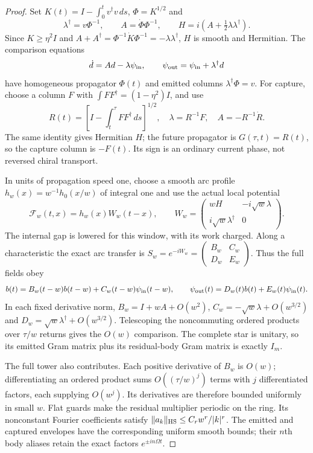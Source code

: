 \begin{proof}
Set $K(t)=I-\int_0^t v^\dagger v\,ds$, $\Phi=K^{1/2}$ and
\[
 \lambda^\dagger=v\Phi^{-1},\qquad
 A=\dot\Phi\Phi^{-1},\qquad
 H=i\left(A+\tfrac12\lambda\lambda^\dagger\right).
\]
Since $K\ge\eta^2I$ and
$A+A^\dagger=\Phi^{-1}\dot K\Phi^{-1}
=-\lambda\lambda^\dagger$, $H$ is smooth and Hermitian.
The comparison equations
\[
 \dot d=Ad-\lambda\psi_{\rm in},\qquad
 \psi_{\rm out}=\psi_{\rm in}+\lambda^\dagger d
\]
have homogeneous propagator $\Phi(t)$ and emitted columns
$\lambda^\dagger\Phi=v$. For capture, choose a column $F$ with
$\int FF^\dagger=(1-\eta^2)I$, and use
\[
 R(t)=\left[I-\int_t^\tau FF^\dagger\,ds\right]^{1/2},\quad
 \lambda=R^{-1}F,\quad A=-R^{-1}\dot R.
\]
The same identity gives Hermitian $H$; the future propagator is
$G(\tau,t)=R(t)$, so the capture column is $-F(t)$.
Its sign is an ordinary current phase, not reversed chiral transport.

In units of propagation speed one, choose a smooth arc profile
$h_w(x)=w^{-1}h_0(x/w)$ of integral one and use the actual local
potential
\begin{equation}
 \mathcal F_w(t,x)=h_w(x)W_w(t-x),\qquad
 W_w=\begin{pmatrix}
 wH&-i\sqrt w\lambda\\ i\sqrt w\lambda^\dagger&0
 \end{pmatrix}.
 \label{eq:packet-star}
\end{equation}
The internal gap is lowered for this window, with its work charged.
Along a characteristic the exact arc transfer is
$S_w=e^{-iW_w}=\left(\begin{smallmatrix}B_w&C_w\\D_w&E_w\end{smallmatrix}\right)$.
Thus the full fields obey
\[
 b(t)=B_w(t-w)b(t-w)+C_w(t-w)\psi_{\rm in}(t-w),\qquad
 \psi_{\rm out}(t)=D_w(t)b(t)+E_w(t)\psi_{\rm in}(t).
\]
In each fixed derivative norm,
$B_w=I+wA+O(w^2)$,
$C_w=-\sqrt w\lambda+O(w^{3/2})$ and
$D_w=\sqrt w\lambda^\dagger+O(w^{3/2})$.
Telescoping the noncommuting ordered products over $\tau/w$
returns gives the $O(w)$ comparison. The complete star is unitary,
so its emitted Gram matrix plus its residual-body Gram matrix is
exactly $I_m$.

The full tower also contributes. Each positive derivative of $B_w$
is $O(w)$; differentiating an ordered product sums $O((\tau/w)^j)$
terms with $j$ differentiated factors, each supplying $O(w^j)$.
Its derivatives are therefore bounded uniformly in small $w$.
Flat guards make the residual multiplier periodic on the ring.
Its nonconstant Fourier coefficients satisfy
$\|a_k\|_{\rm HS}\le C_r w^r/|k|^r$.
The emitted and captured envelopes have the corresponding uniform
smooth bounds; their $n$th body aliases retain the exact factors
$e^{\pm in\Omega t}$.


\end{proof}

